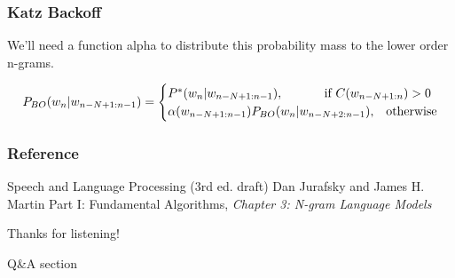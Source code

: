 \documentclass[13.5pt,aspecratio=169]{beamer}
\begin{document}


\begin{frame}
    \onehalfspacing
        \frametitle{Katz Backoff}
        {\Large We’ll need a function alpha to distribute this probability mass to the lower order n-grams.
        }

        \begin{equation*}
            P_{BO} (w_n | w_{n-N+1:n-1})=
            \begin{cases}
              P^*(w_n | w_{n-N+1:n-1}), & \hspace{-5em} \text{if}\ C(w_{n-N+1:n}) > 0 \\
              \alpha(w_{n-N+1:n-1}) P_{BO} (w_n | w_{n-N+2:n-1}), & \text{otherwise}
            \end{cases}
          \end{equation*}
    
        
\end{frame}



\onehalfspacing
\begin{frame} %
	\frametitle{Reference}
	
	\begin{thebibliography}{99} %
		\footnotesize %
		
			Speech and Language Processing (3rd ed. draft)
			\newblock Dan Jurafsky and James H. Martin
			\newblock Part I: Fundamental Algorithms, \emph{Chapter 3: 	N-gram Language Models}
			
	\end{thebibliography}
\end{frame}




\begin{frame} %
	\begin{center}
		{\Huge Thanks for listening!}
		
		\bigskip\bigskip %
		
		{\LARGE Q\&A section}
	\end{center}
\end{frame}
\end{document}
